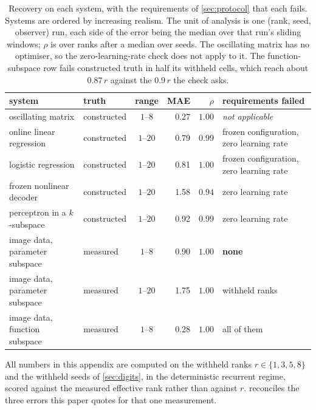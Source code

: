 \documentclass{article}
\begin{document}
\begin{table}[H]
\centering
\caption{Recovery on each system, with the requirements of \cref{sec:protocol} that each fails. Systems are ordered by increasing realism. The
unit of analysis is one (rank, seed, observer) run, each side of the error being the median over
that run's sliding windows; $\rho$ is over ranks after a median over seeds. The oscillating matrix
has no optimiser, so the zero-learning-rate check does not apply to it. The function-subspace row
fails constructed truth in half its withheld cells, which reach about $0.87\,r$ against the
$0.9\,r$ the check asks.}
\label{tab:ladder}
\setlength{\tabcolsep}{3pt}
\begin{tabular}{llcrr>{\raggedright\arraybackslash}p{3.15cm}}
\toprule
system & truth & range & MAE & $\rho$ & requirements failed \\
\midrule
oscillating matrix             & constructed & $1$--$8$\phantom{0}  & 0.27 & $1.00$ & \emph{not applicable} \\
online linear regression       & constructed & $1$--$20$ & 0.79 & $0.99$ & frozen configuration, zero learning rate \\
logistic regression            & constructed & $1$--$20$ & 0.81 & $1.00$ & frozen configuration, zero learning rate \\
frozen nonlinear decoder       & constructed & $1$--$20$ & 1.58 & $0.94$ & zero learning rate \\
perceptron in a $k$-subspace   & constructed & $1$--$20$ & 0.92 & $0.99$ & zero learning rate \\
image data, parameter subspace & measured    & $1$--$8$  & 0.90 & $1.00$ & \textbf{none} \\
image data, parameter subspace & measured    & $1$--$20$ & 1.75 & $1.00$ & withheld ranks \\
image data, function subspace  & measured    & $1$--$8$  & 0.28 & $1.00$ & all of them \\
\bottomrule
\end{tabular}
\end{table}


All numbers in this appendix are computed on the withheld ranks $r \in \{1,3,5,8\}$ and the
withheld seeds of \cref{sec:digits}, in the deterministic recurrent regime, scored against the
measured effective rank rather than against $r$.  reconciles the three
errors this paper quotes for that one measurement.
\end{document}
